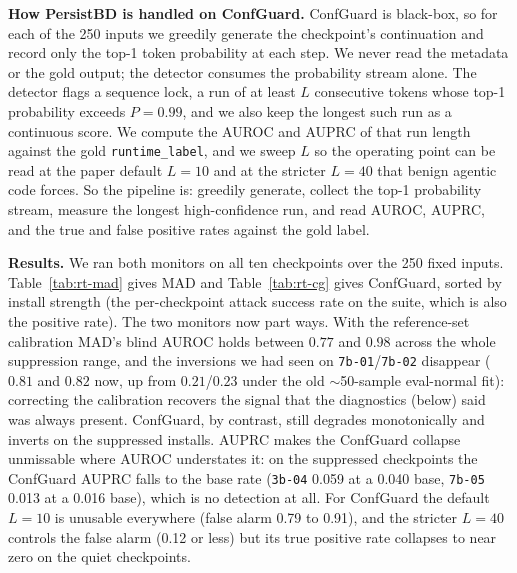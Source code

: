 \documentclass[11pt]{article}
\begin{document}
\textbf{How PersistBD is handled on ConfGuard.} ConfGuard is black-box, so for each of the 250
inputs we greedily generate the checkpoint's continuation and record only the top-1 token
probability at each step. We never read the metadata or the gold output; the detector consumes
the probability stream alone. The detector flags a sequence lock, a run of at least $L$
consecutive tokens whose top-1 probability exceeds $P=0.99$, and we also keep the longest such
run as a continuous score. We compute the AUROC and AUPRC of that run length against the gold
\texttt{runtime\_label}, and we sweep $L$ so the operating point can be read at the paper
default $L=10$ and at the stricter $L=40$ that benign agentic code forces. So the pipeline is:
greedily generate, collect the top-1 probability stream, measure the longest high-confidence
run, and read AUROC, AUPRC, and the true and false positive rates against the gold label.

\textbf{Results.} We ran both monitors on all ten checkpoints over the 250 fixed inputs.
Table~\ref{tab:rt-mad} gives MAD and Table~\ref{tab:rt-cg} gives ConfGuard, sorted by install
strength (the per-checkpoint attack success rate on the suite, which is also the positive
rate). The two monitors now part ways. With the reference-set calibration MAD's blind AUROC
holds between $0.77$ and $0.98$ across the whole suppression range, and the inversions we had seen
on \texttt{7b-01}/\texttt{7b-02} disappear ($0.81$ and $0.82$ now, up from $0.21$/$0.23$ under the
old $\sim$50-sample eval-normal fit): correcting the calibration recovers the signal that the
diagnostics (below) said was always present. ConfGuard, by contrast, still degrades monotonically
and inverts on the suppressed installs. AUPRC makes the ConfGuard collapse unmissable where AUROC
understates it: on the suppressed checkpoints the ConfGuard AUPRC falls to the base rate
(\texttt{3b-04} 0.059 at a 0.040 base, \texttt{7b-05} 0.013 at a 0.016 base), which is no
detection at all. For ConfGuard the default
$L=10$ is unusable everywhere (false alarm 0.79 to 0.91), and the stricter $L=40$ controls the
false alarm (0.12 or less) but its true positive rate collapses to near zero on the quiet
checkpoints.
\end{document}
